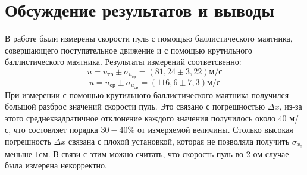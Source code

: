 \documentclass[a4paper,12pt]{article} %
\begin{document}
\section{Обсуждение результатов и выводы}
В работе были измерены скорости пуль с помощью баллистического маятника, совершающего поступательное движение и с помощью крутильного баллистического маятника. Результаты измерений соответсвенно:
\[u = u_\text{ср}\pm\sigma_{u_\text{ср}} = (81,24\pm3,22)\text{м/с}\]
\[u = u_\text{ср}\pm\sigma_{u_\text{ср}} = (116,6\pm7,3)\text{м/с}\]
При измерении с помощью крутильного баллистического маятника получился большой разброс значений скорости пуль. Это связано с погрешностью $\Delta x$, из-за этого среднеквадратичное отклонение каждого значения получилось около $40$ м/с, что состовляет порядка $30-40\%$ от измеряемой величины. Столько высокая погрешность $\Delta x$ связана с плохой установкой, которая не позволяла получить $\sigma_{x_0}$ меньше $1$см. В связи с этим можно считать, что скорость пуль во 2-ом случае была измерена некорректно.
\end{document}
